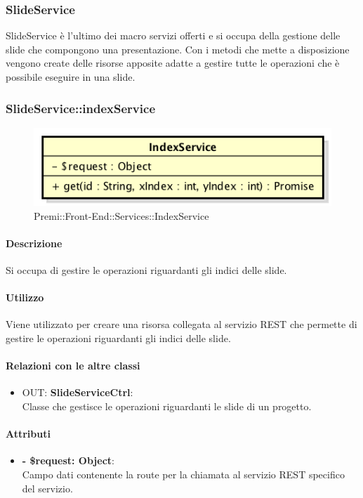 \subsubsection{SlideService}
SlideService è l'ultimo dei macro servizi offerti e si occupa della gestione delle slide che compongono una presentazione. Con i metodi che mette a disposizione vengono create delle risorse apposite adatte a gestire tutte le operazioni che è possibile eseguire in una slide.


		\subsubsection{SlideService::indexService}
		\begin{figure}[h]
			\centering
				\includegraphics[width=0.4\linewidth]{img/premi_front_end_services_indexservice}
			\caption[Premi::Front-End::Services::IndexService]{Premi::Front-End::Services::IndexService}
		\end{figure}
		
		\paragraph{Descrizione}
		Si occupa di gestire le operazioni riguardanti gli indici delle slide.
		
		\paragraph{Utilizzo}
		Viene utilizzato per creare una risorsa collegata al servizio REST che permette di gestire le operazioni riguardanti gli indici delle slide.
		
		\paragraph{Relazioni con le altre classi}
		\begin{itemize}
			\item OUT: \textbf{SlideServiceCtrl}:\\
			Classe che gestisce le operazioni riguardanti le slide di un progetto.
		\end{itemize}
		
		\paragraph{Attributi}
		\begin{itemize}
			\item \textbf{- \$request: Object}:\\
			Campo dati contenente la route per la chiamata al servizio REST specifico del servizio.
		\end{itemize}	
		
